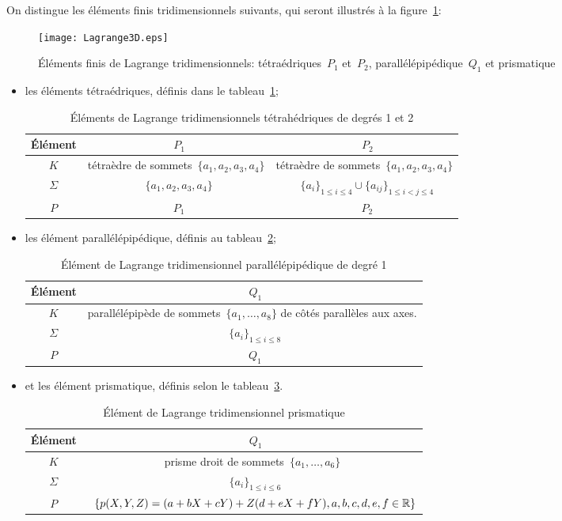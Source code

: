 On distingue les éléments finis tridimensionnels suivants, qui seront illustrés à la figure~\ref{Lagrange3D}:
\begin{figure}[h!]
\centering
\texttt{[image: Lagrange3D.eps]}
\caption{Éléments finis de Lagrange tridimensionnels: tétraédriques~$P_1$ et~$P_2$, parallélépipédique~$Q_1$ et prismatique}\label{Lagrange3D}
\end{figure}
\begin{itemize}
\item les éléments tétraédriques, définis dans le tableau~\ref{tab:Elem:tri};
\begin{table}[h!]
\centering\small
\begin{tabular}{c|cc}
Élément &~$P_1$ &~$P_2$ \\
\hline
$K$	  & tétraèdre de sommets~$\{a_1, a_2, a_3, a_4\}$ & tétraèdre de sommets~$\{a_1, a_2, a_3, a_4\}$\\
$\Sigma$ &~$\{a_1, a_2, a_3, a_4\}$ &~$\{a_i\}_{1\le i\le4}\cup\{a_{ij}\}_{1\le i<j\le 4}$ \\
$P$   &~$P_1$ &~$P_2$ \\
\hline
\end{tabular}
\caption{Éléments de Lagrange tridimensionnels tétrahédriques de degrés 1 et 2}\label{tab:Elem:tri}
\end{table}
\item les élément parallélépipédique, définis au tableau~\ref{tab:Elem:para};
\begin{table}[h!]
\centering\small
\begin{tabular}{c|c}
Élément &~$Q_1$\\
\hline
$K$ & parallélépipède de sommets~$\{a_1,\ldots, a_8\}$ de côtés parallèles aux axes.\\
$\Sigma$ &~$\{a_i\}_{1\le i\le8}$\\
$P$ &~$Q_1$\\
\hline
\end{tabular}
\caption{Élément de Lagrange tridimensionnel parallélépipédique de degré 1}\label{tab:Elem:para}
\end{table}
\item et les élément prismatique, définis selon le tableau~\ref{tab:Elem:pri}.
\begin{table}[h!]
\centering\small
\begin{tabular}{c|c}
Élément &~$Q_1$\\
\hline
$K$ & prisme droit de sommets~$\{a_1,\ldots, a_6\}$\\
$\Sigma$ &~$\{a_i\}_{1\le i\le6}$\\
$P$ &~$\{p(X,Y,Z) = (a + bX + cY ) + Z(d + eX + fY ), a,b,c,d,e,f\in\mathbb R\}$\\
\hline
\end{tabular}
\caption{Élément de Lagrange tridimensionnel prismatique}\label{tab:Elem:pri}
\end{table}
\end{itemize}


